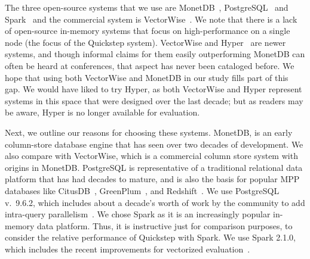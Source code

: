 The three open-source systems that we use are MonetDB~\cite{monetdb}, PostgreSQL~\cite{postgres} and Spark~\cite{Spark, SparkSQL} and the commercial system is VectorWise~\cite{vectorwise}. 
We note that there is a lack of open-source in-memory systems that focus on high-performance on a single node (the focus of the Quickstep system). 
VectorWise and Hyper~\cite{hyper} are newer systems, and though informal claims for them easily outperforming MonetDB can often be heard at conferences, that aspect has never been cataloged before. 
We hope that using both VectorWise  and MonetDB in our study fills part of this gap. 
We would have liked to try Hyper, as both VectorWise and Hyper represent systems in this space that were designed over the last decade; but as readers may be aware, Hyper is no longer available for evaluation.

Next, we outline our reasons for choosing these systems.
MonetDB, is an early column-store database engine that has seen over two decades of development.
We also compare with VectorWise, which is a commercial column store system with origins in MonetDB.
PostgreSQL is representative of a traditional relational data platform that has had decades to mature, and is also the basis for popular MPP databases like CitusDB~\cite{citusdata}, GreenPlum~\cite{greenplum}, and Redshift~\cite{redshift}. We use PostgreSQL v.~9.6.2, which includes about a decade's worth of work by the community to add intra-query parallelism~\cite{pg-parallelquery}.
We chose Spark as it is an increasingly popular in-memory data platform. Thus, it is instructive just for comparison purposes, to consider the relative performance of Quickstep with Spark. We use Spark 2.1.0, which includes the recent improvements for vectorized evaluation~\cite{spark-10x-in-2}.


